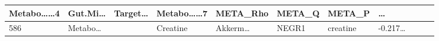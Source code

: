 \documentclass[
]{article}
\begin{document}
\begin{longtable}[]{@{}lllllllllll@{}}
\begin{minipage}[b]{0.09\columnwidth}
Metabo\ldots\ldots4\strut
\end{minipage} & \begin{minipage}[b]{0.07\columnwidth}\raggedright
Gut.Mi\ldots{}\strut
\end{minipage} & \begin{minipage}[b]{0.07\columnwidth}\raggedright
Target\ldots{}\strut
\end{minipage} & \begin{minipage}[b]{0.09\columnwidth}\raggedright
Metabo\ldots\ldots7\strut
\end{minipage} & \begin{minipage}[b]{0.07\columnwidth}\raggedright
META\_Rho\strut
\end{minipage} & \begin{minipage}[b]{0.07\columnwidth}\raggedright
META\_Q\strut
\end{minipage} & \begin{minipage}[b]{0.07\columnwidth}\raggedright
META\_P\strut
\end{minipage} & \begin{minipage}[b]{0.03\columnwidth}\raggedright
\ldots{}\strut
\end{minipage}\tabularnewline
\midrule
\endhead
\begin{minipage}[t]{0.03\columnwidth}\raggedright
586\strut
\end{minipage} & \begin{minipage}[t]{0.07\columnwidth}\raggedright
Metabo\ldots{}\strut
\end{minipage} & \begin{minipage}[t]{0.07\columnwidth}\raggedright
\strut
\end{minipage} & \begin{minipage}[t]{0.09\columnwidth}\raggedright
Creatine\strut
\end{minipage} & \begin{minipage}[t]{0.07\columnwidth}\raggedright
Akkerm\ldots{}\strut
\end{minipage} & \begin{minipage}[t]{0.07\columnwidth}\raggedright
NEGR1\strut
\end{minipage} & \begin{minipage}[t]{0.09\columnwidth}\raggedright
creatine\strut
\end{minipage} & \begin{minipage}[t]{0.07\columnwidth}\raggedright
-0.217\ldots{}\strut
\end{minipage} & \begin{minipage}[t]{0.07\columnwidth}\raggedright

\end{minipage}
\end{longtable}
\end{document}
